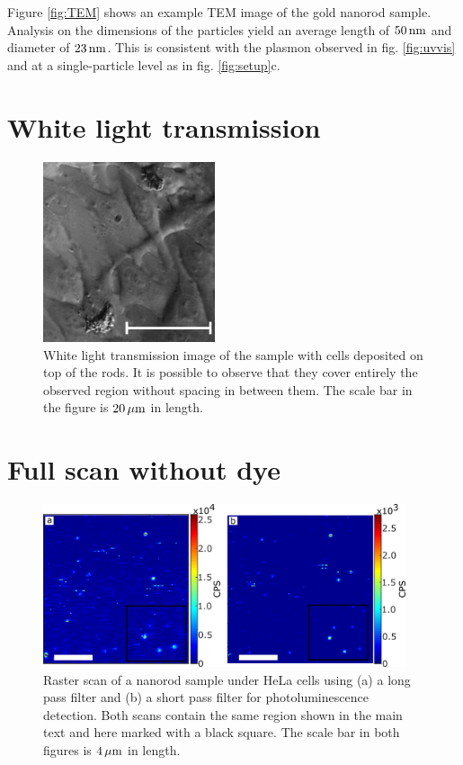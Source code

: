 Figure \ref{fig:TEM} shows an example TEM image of the gold nanorod sample.
Analysis on the dimensions of the particles yield an average length of $50\,\textrm{nm}$
and diameter of $23\,\textrm{nm}$. This is consistent with the plasmon observed in fig.
\ref{fig:uvvis} and at a single-particle level as in fig. \ref{fig:setup}c.

\section{White light transmission}
\begin{figure}[htp]
\centering
	\includegraphics[width=0.45\textwidth]{Chapters/03_Background_Free/Figures/Supplementary/05_White_Light/white_light_scale.png}
	\caption{White light transmission image of the sample with cells deposited on
	top of the rods. It is possible to observe that they cover entirely the
	observed region without spacing in between them. The scale bar in the figure
	is $20\,\mu\textrm{m}$ in length.}
	\label{fig:white-light}
\end{figure}

\section{Full scan without dye}
\begin{figure}[htp] \centering
\includegraphics[width=0.95\textwidth]{Chapters/03_Background_Free/Figures/Supplementary/06_Full_scans/full_no_dye.png}
\caption{Raster scan of a nanorod sample under HeLa cells using (a) a long pass
filter and (b) a short pass filter for photoluminescence detection. Both scans
contain the same region shown in the main text and here marked with a black
square. The scale bar in both figures is $4\,\mu\textrm{m}$ in length.}
	\label{fig:full_no_dye}
\end{figure}


